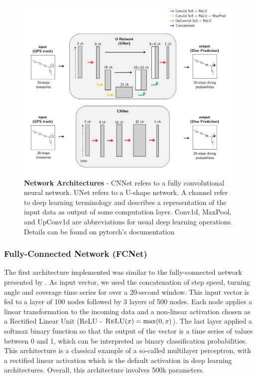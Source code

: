 \documentclass{article}
\begin{document}
\begin{figure}[!h]
  \includegraphics[scale=0.45]{figure_network.png}
  \caption{\textbf{Network Architectures} - CNNet refers to a fully convolutional neural network. UNet refers to a U-shape network. A channel refer to deep learning terminology and describes a representation of the input data as output of some computation layer. Conv1d, MaxPool, and UpConv1d are abbreviations for usual deep learning operations. Details can be found on pytorch's documentation \cite{paskze_pytorch_2019} }
  \label{figure_network}
\end{figure}

\subsubsection{Fully-Connected Network (FCNet)}
The first architecture implemented was similar to the fully-connected network presented by \cite{browning_predicting_2018}. As input vector, we used the concatenation of step speed, turning angle and coverage time series for over a 20-second window. This input vector is fed to a layer of 100 nodes followed by 3 layers of 500 nodes. Each node applies a linear transformation to the incoming data and a non-linear activation chosen as a Rectified Linear Unit (ReLU - $\textsc{ReLU}(x) = \max(0,x)$). The last layer applied a softmax binary function so that the output of the vector is a time series of values between  0 and 1, which can be interpreted as binary classification probabilities. This  architecture is a classical example of a so-called multilayer perceptron, with a rectified linear activation which is the default activation in deep learning architectures. Overall, this architecture involves 500k parameters.
\end{document}
